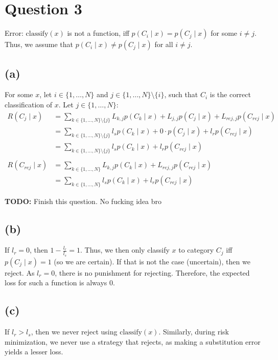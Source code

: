 \section*{Question 3}
Error: $\text{classify}(x)$ is not a function, iff $p(C_i \mid x) = p(C_j \mid x)$ for some $i \neq j$. Thus, we assume that $p(C_i \mid x) \neq p(C_j \mid x)$ for all $i \neq j$.

\subsection*{(a)}
For some $x$, let $i \in \{1, \dots, N\}$ and $j \in \{1, \dots, N\} \setminus \{i\}$, such that $C_i$ is the correct classification of $x$. Let $j \in \{1, \dots, N\}$:
\begin{align*}
	R(C_j \mid x) &= \sum_{k \in \{1, \dots, N\} \setminus \{j\}} L_{k,j} p(C_k \mid x) + L_{j,j} p(C_j \mid x) + L_{rej,j} p(C_{rej} \mid x) \\
	&= \sum_{k \in \{1, \dots, N\} \setminus \{j\}} l_s p(C_k \mid x) + 0 \cdot p(C_j \mid x) + l_r p(C_{rej} \mid x) \\
	&= \sum_{k \in \{1, \dots, N\} \setminus \{j\}} l_s p(C_k \mid x) + l_r p(C_{rej} \mid x) \\\\
	R(C_{rej} \mid x) &= \sum_{k \in \{1, \dots, N\}} L_{k,j} p(C_k \mid x) + L_{rej,j} p(C_{rej} \mid x) \\
	&= \sum_{k \in \{1, \dots, N\}} l_s p(C_k \mid x) + l_r p(C_{rej} \mid x)
\end{align*}

\textbf{TODO:} Finish this question. No fucking idea bro

\subsection*{(b)}
If $l_r=0$, then $1-\frac{l_r}{l_s} = 1$. Thus, we then only classify $x$ to category $C_j$ iff $p(C_j \mid x) = 1$ (so we are certain). If that is not the case (uncertain), then we reject. As $l_r=0$, there is no punishment for rejecting. Therefore, the expected loss for such a function is always $0$.

\subsection*{(c)}
If $l_r>l_s$, then we never reject using $\text{classify}(x)$. Similarly, during risk minimization, we never use a strategy that rejects, as making a substitution error yields a lesser loss.